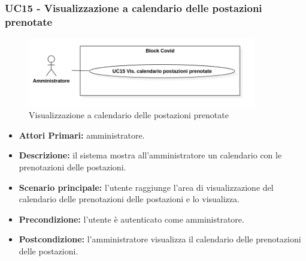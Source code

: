 \subsubsection{ UC15 - Visualizzazione a calendario delle postazioni prenotate}
\begin{figure}[H]
	\centering
	\includegraphics[width=10cm]{res/images/UC15.png}
	\caption{Visualizzazione a calendario delle postazioni prenotate}
\end{figure}
\begin{itemize}
	\item\textbf{Attori Primari:}
	amministratore.
	\item\textbf{Descrizione:}
	il sistema mostra all'amministratore un calendario con le prenotazioni delle postazioni.
	\item\textbf{Scenario principale:}
	l'utente raggiunge l'area di visualizzazione del calendario delle prenotazioni delle postazioni e lo visualizza.
	\item\textbf{Precondizione:} 
	l'utente è autenticato come amministratore.
	\item\textbf{Postcondizione:}
	l'amministratore visualizza il calendario delle prenotazioni delle postazioni.
\end{itemize}

